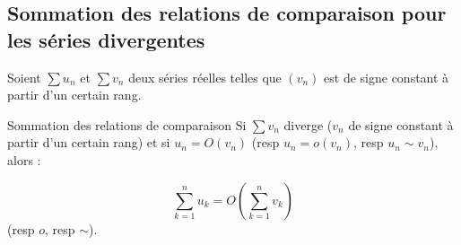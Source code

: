 \subsection{Sommation des relations de comparaison pour les séries divergentes}

Soient $\sum u_n$ et $\sum v_n$ deux séries réelles telles que $(v_n)$ est de signe constant à partir 
d'un certain rang. 


\begin{proposition}{Sommation des relations de comparaison}{}
    Si $\sum v_n$ diverge ($v_n$ de signe constant à partir d'un certain rang) et si $u_n = O(v_n)$ (resp $u_n = o(v_n)$, resp $u_n \sim v_n$),
    alors :
    
    \[\sum_{k = 1 }^{n }u_k = O\left( \sum_{k = 1}^{n} v_k \right)\]
    (resp $o$, resp $\sim$).
\end{proposition}

